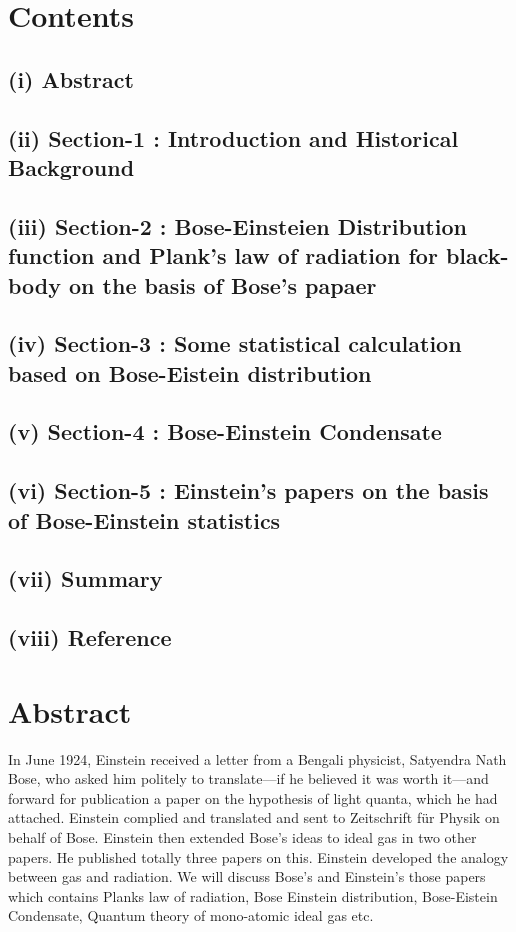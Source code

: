 \documentclass[12pt, letterpaper]{article}
\begin{document}
    \section*{Contents}
    \subsection*{(i) Abstract}
    \subsection*{(ii) Section-1 : Introduction and Historical Background}
    \subsection*{(iii) Section-2 : Bose-Einsteien Distribution function and Plank's law of radiation for black-body on the basis of Bose's papaer}
    \subsection*{(iv) Section-3 : Some statistical calculation based on Bose-Eistein distribution}
    \subsection*{(v) Section-4 : Bose-Einstein Condensate}
    \subsection*{(vi) Section-5 : Einstein's papers on the basis of Bose-Einstein statistics}
    \subsection*{(vii) Summary}
    \subsection*{(viii) Reference}
    \newpage
    \section*{Abstract}
        In June 1924, Einstein received a letter from a Bengali physicist,
        Satyendra Nath Bose, who asked him politely to translate—if he believed it
        was worth it—and forward for publication a paper on the hypothesis of light
        quanta, which he had attached. Einstein complied and translated and sent
        to Zeitschrift für Physik on behalf of Bose. Einstein then extended Bose's ideas to ideal gas in two other papers.
        He published totally three papers on this. Einstein developed the analogy between gas and radiation.
        We will discuss Bose's and Einstein's those papers which contains Planks law of radiation, Bose Einstein
        distribution, Bose-Eistein Condensate, Quantum theory of mono-atomic ideal gas etc. 
\end{document}
